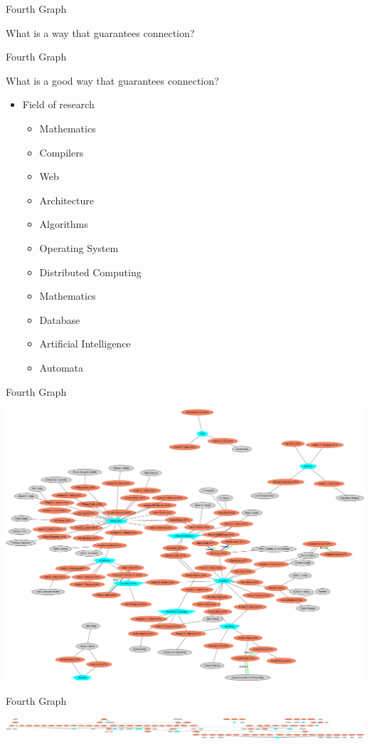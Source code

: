 \documentclass[11pt,aspectratio=169]{beamer}
\begin{document}
\begin{frame}{Fourth Graph}
    \begin{center}
        What is a way that guarantees connection?
    \end{center}
\end{frame}

\begin{frame}{Fourth Graph}
    \begin{center}
        What is a good way that guarantees connection?
    \end{center}
    \pause
    \begin{itemize}
        \item Field of research \pause
        \begin{itemize}
            \item Mathematics
            \item Compilers
            \item Web
            \item Architecture
            \item Algorithms
            \item Operating System
            \item Distributed Computing
            \item Mathematics
            \item Database
            \item Artificial Intelligence
            \item Automata
        \end{itemize}
    \end{itemize}
\end{frame}

\begin{frame}{Fourth Graph}
    \vspace{-0.25cm}
        \begin{center}
            \includegraphics[scale=0.1]{neatorel5.png}
        \end{center}
\end{frame}

\begin{frame}{Fourth Graph}
        \begin{center}
            \includegraphics[scale=0.033]{dotrel5.png}
        \end{center}
\end{frame}
\end{document}
